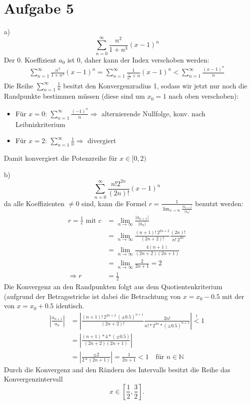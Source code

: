 \documentclass[a4paper]{article}
\begin{document}
\thispagestyle{fancy}
\section*{Aufgabe 5}
\par{a)}
\[
	\sum_{n=0}^\infty \frac{n^2}{1+n^3} (x-1)^n 
\]
Der 0. Koeffizient $a_0$ ist 0, daher kann der Index verschoben werden:
\begin{align*}
	\sum_{n=1}^\infty \frac{n^2}{1+n^3} (x-1)^n =
	\sum_{n=1}^\infty \frac{1}{\frac{1}{n^2}+n} (x-1)^n <
	\sum_{n=1}^\infty \frac{(x-1)^n}{n}
\end{align*}
Die Reihe $\sum_{n=1}^\infty\frac{1}{n}$ besitzt den Konvergenzradius 1, sodass wir jetzt nur noch die Randpunkte bestimmen müssen (diese sind um $x_0 = 1$ nach oben verschoben):
\begin{itemize}
	\item Für $x=0$:
		$ \sum_{n=1}^\infty \frac{(-1)^n}{n} 
		\Rightarrow$
		alternierende Nullfolge, konv. nach Leibnizkriterium
	\item Für $x=2$:
		$ \sum_{n=1}^\infty \frac{1}{n}
		\Rightarrow $
		divergiert
\end{itemize}
Damit konvergiert die Potenzreihe für $ x \in [0, 2)$

\vspace{0.5cm}
\par{b)}
\[
	\sum_{n=0}^\infty \frac{n! 2^{2n}}{(2n)!} (x - 1)^n
\]
da alle Koeffizienten $\neq 0$ sind, kann die Formel 
$r = \frac 1 {\lim_{n\rightarrow\infty} \frac{\vert a_{n+1} \vert}{\vert a_n \vert}} $ benutzt werden:
\begin{align*}
	r = \frac 1 c 
	\text{ mit }c &= \lim_{n\rightarrow\infty} 
	\frac{\vert a_{n+1} \vert}{\vert a_n\vert} \\
	&= \lim_{n\rightarrow\infty}
	\frac{(n+1)! \ 2^{2n+2}}{(2n+2)!}
	\frac{(2n)!}{n! \ 2^{2n}} \\
	&= \lim_{n\rightarrow\infty}
	\frac{4 (n+1)}{(2n+2)(2n+1)} \\
	&= \lim_{n\rightarrow\infty}
	\frac{2}{2n+1}
	=
	2 \\
	\Rightarrow r &= \frac{1}{2}
\end{align*}
Die Konvergenz an den Randpunkten folgt aus dem Quotientenkriterium 
(aufgrund der Betragsstriche ist dabei die Betrachtung von 
$x = x_0 - 0.5$ mit der von $x = x_0 + 0.5$ identisch.
\begin{align*}
	\left|
	\frac{a_{n+1}}{a_n}\right| 
	&= \left|
	\frac{(n+1)! \ 2^{2n+2} \ (\pm0.5)^{n+1}}{(2n+2)!} 
	\frac{2n!}{n! * 2^{2n} * (\pm0.5)^{n+1}}
	\right| 
	\overset ! < 1
	\\ 
	&= \left|
	\frac{(n+1) * 4 * (\pm0.5)}{(2n+2)(2n+1)}
	\right| \\
	&= \left|
	\frac{\pm2}{2*(2n+1)} 
	\right| = \frac 1 {2n + 1} < 1 \quad
	\text{für } n \in \mathbb{N}
\end{align*}
Durch die Konvergenz and den Rändern des Intervalls besitzt die Reihe das Konvergenzintervall 
\[ x \in \left[\frac12, \frac32 \right]. \]
\end{document}
